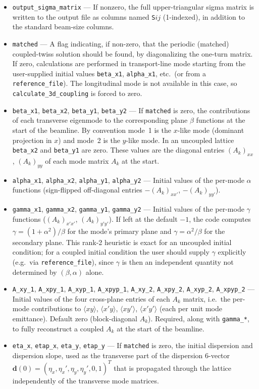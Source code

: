 \documentclass[11pt]{article}
\begin{document}
\begin{itemize}
\item \verb|output_sigma_matrix| --- If nonzero, the full upper-triangular sigma matrix is written
  to the output file as columns named \verb|S|$ij$ (1-indexed), in addition to the standard beam-size
  columns.

\item \verb|matched| --- A flag indicating, if non-zero, that the periodic (matched) coupled-twiss
  solution should be found, by diagonalizing the one-turn matrix.  If zero, calculations are
  performed in transport-line mode starting from the user-supplied initial values
  \verb|beta_x1|, \verb|alpha_x1|, etc.\ (or from a \verb|reference_file|).  The longitudinal
  mode is not available in this case, so \verb|calculate_3d_coupling| is forced to zero.

\item \verb|beta_x1|, \verb|beta_x2|, \verb|beta_y1|, \verb|beta_y2| --- If \verb|matched| is zero,
  the contributions of each transverse eigenmode to the corresponding plane $\beta$ functions at
  the start of the beamline.  By convention mode~1 is the $x$-like mode (dominant projection in
  $x$) and mode~2 is the $y$-like mode.  In an uncoupled lattice \verb|beta_x2| and \verb|beta_y1|
  are zero.  These values are the diagonal entries $(A_k)_{xx}$, $(A_k)_{yy}$ of each mode matrix
  $A_k$ at the start.
\item \verb|alpha_x1|, \verb|alpha_x2|, \verb|alpha_y1|, \verb|alpha_y2| --- Initial values of the
  per-mode $\alpha$ functions (sign-flipped off-diagonal entries $-(A_k)_{xx'}$, $-(A_k)_{yy'}$).
\item \verb|gamma_x1|, \verb|gamma_x2|, \verb|gamma_y1|, \verb|gamma_y2| --- Initial values of the
  per-mode $\gamma$ functions ($(A_k)_{x'x'}$, $(A_k)_{y'y'}$).  If left at the default $-1$, the
  code computes $\gamma = (1 + \alpha^2)/\beta$ for the mode's primary plane and
  $\gamma = \alpha^2/\beta$ for the secondary plane.  This rank-2 heuristic is exact for an
  uncoupled initial condition; for a coupled initial condition the user should supply $\gamma$
  explicitly (e.g.\ via \verb|reference_file|), since $\gamma$ is then an independent quantity not
  determined by $(\beta, \alpha)$ alone.
\item \verb|A_xy_1|, \verb|A_xpy_1|, \verb|A_xyp_1|, \verb|A_xpyp_1|,
      \verb|A_xy_2|, \verb|A_xpy_2|, \verb|A_xyp_2|, \verb|A_xpyp_2| ---
  Initial values of the four cross-plane entries of each $A_k$ matrix, i.e.\ the per-mode
  contributions to $\langle x y \rangle$, $\langle x' y \rangle$, $\langle x y' \rangle$,
  $\langle x' y' \rangle$ (each per unit mode emittance).  Default zero (block-diagonal $A_k$).
  Required, along with \verb|gamma_*|, to fully reconstruct a coupled $A_k$ at the start of the
  beamline.
\item \verb|eta_x|, \verb|etap_x|, \verb|eta_y|, \verb|etap_y| --- If \verb|matched| is zero,
  the initial dispersion and dispersion slope, used as the transverse part of the dispersion
  6-vector $\mathbf{d}(0) = (\eta_x, \eta_x', \eta_y, \eta_y', 0, 1)^T$ that is propagated
  through the lattice independently of the transverse mode matrices.


\end{itemize}
\end{document}
